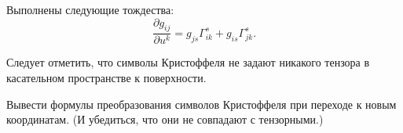 \begin{lemma}
	Выполнены следующие тождества:
	\begin{equation} \label{eq:AlmostCristoffelIdentity}
		\frac{\partial g_{ij}}{\partial u^k} = g_{js}\Gamma^s_{ik} + g_{is}\Gamma^s_{jk}.
	\end{equation}
\end{lemma}

Следует отметить, что символы Кристоффеля не задают никакого тензора в касательном пространстве к поверхности.

\begin{problem} \label{problem:ChristoffelNotTensor}
	Вывести формулы преобразования символов Кристоффеля при переходе к новым координатам. (И убедиться, что они не совпадают с тензорными.)
\end{problem}

